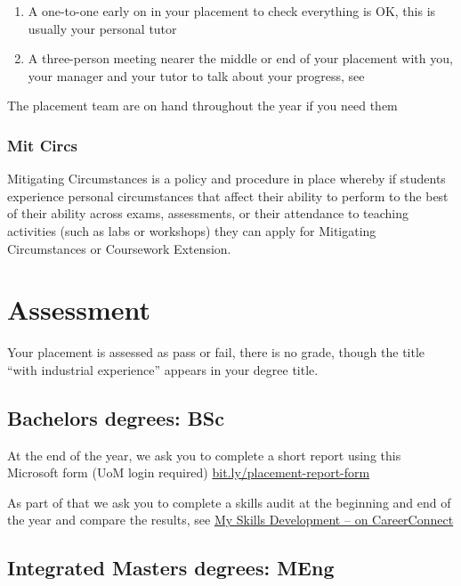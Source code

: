 \documentclass[
]{book}
\providecommand{\tightlist}{%
  \setlength{\itemsep}{0pt}\setlength{\parskip}{0pt}}
\begin{document}
\begin{enumerate}
\def\labelenumi{\arabic{enumi}.}
\tightlist
\item
  A one-to-one early on in your placement to check everything is OK, this is usually your personal tutor
\item
  A three-person meeting nearer the middle or end of your placement with you, your manager and your tutor to talk about your progress, see
\end{enumerate}

The placement team are on hand throughout the year if you need them

\subsection{Mit Circs}\label{mit-circs}

Mitigating Circumstances is a policy and procedure in place whereby if students experience personal circumstances that affect their ability to perform to the best of their ability across exams, assessments, or their attendance to teaching activities (such as labs or workshops) they can apply for Mitigating Circumstances or Coursework Extension.

\chapter{Assessment}\label{assessment}

Your placement is assessed as pass or fail, there is no grade, though the title ``with industrial experience'' appears in your degree title.

\section{Bachelors degrees: BSc}\label{bsc}

At the end of the year, we ask you to complete a short report using this Microsoft form (UoM login required) \href{https://bit.ly/placement-report-form}{bit.ly/placement-report-form}

As part of that we ask you to complete a skills audit at the beginning and end of the year and compare the results, see \href{https://www.careers.manchester.ac.uk/findjobs/skills/myskills/}{My Skills Development -- on CareerConnect} \citep{audit}

\section{Integrated Masters degrees: MEng}\label{meng}
\end{document}
